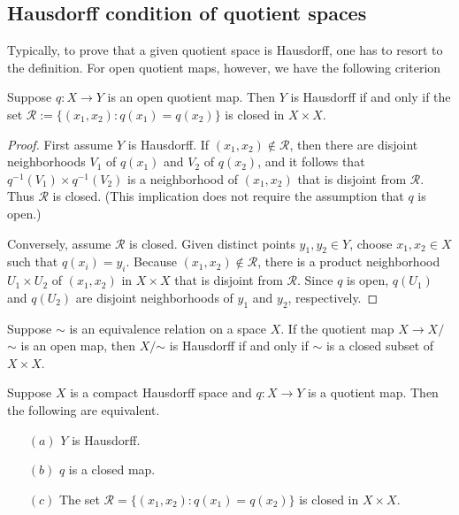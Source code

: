 \subsection{Hausdorff condition of quotient spaces}
Typically, to prove that a given quotient space is Hausdorff, one has to resort to the definition. For open quotient maps, however, we have the following criterion
\begin{proposition}\label{quotient Hausdorff}
Suppose $q:X\to Y$ is an open quotient map. Then $Y$ is Hausdorff if and only if the set $\mathcal{R}:=\{(x_1,x_2):q(x_1)=q(x_2)\}$ is closed in $X\times X$.
\end{proposition}
\begin{proof}
First assume $Y$ is Hausdorff. If $(x_1,x_2)\notin\mathcal{R}$, then there are disjoint neighborhoods $V_1$ of $q(x_1)$ and $V_2$ of $q(x_2)$, and it follows that $q^{-1}(V_1)\times q^{-1}(V_2)$ is a neighborhood of $(x_1,x_2)$ that is disjoint from $\mathcal{R}$. Thus $\mathcal{R}$ is closed. (This implication does not require the assumption that $q$ is open.)\par
Conversely, assume $\mathcal{R}$ is closed. Given distinct points $y_1,y_2\in Y$, choose $x_1,x_2\in X$ such that $q(x_i)=y_i$. Because $(x_1,x_2)\notin\mathcal{R}$, there is a product neighborhood $U_1\times U_2$ of $(x_1,x_2)$ in $X\times X$ that is disjoint from $\mathcal{R}$. Since $q$ is open, $q(U_1)$ and $q(U_2)$ are disjoint neighborhoods of $y_1$ and $y_2$, respectively.
\end{proof}
\begin{corollary}
Suppose $\sim$ is an equivalence relation on a space $X$. If the quotient map $X\to X/$$\sim$ is an open map, then $X/$$\sim$ is Hausdorff if and only if $\sim$ is a closed subset of $X\times X$.
\end{corollary}
\begin{theorem}
Suppose $X$ is a compact Hausdorff space and $q:X\to Y$ is a quotient map. Then the following are equivalent.
\begin{itemize}
\item[$(a)$]$Y$ is Hausdorff.
\item[$(b)$]$q$ is a closed map.
\item[$(c)$]The set $\mathcal{R}=\{(x_1,x_2):q(x_1)=q(x_2)\}$ is closed in $X\times X$.
\end{itemize}
\end{theorem}
